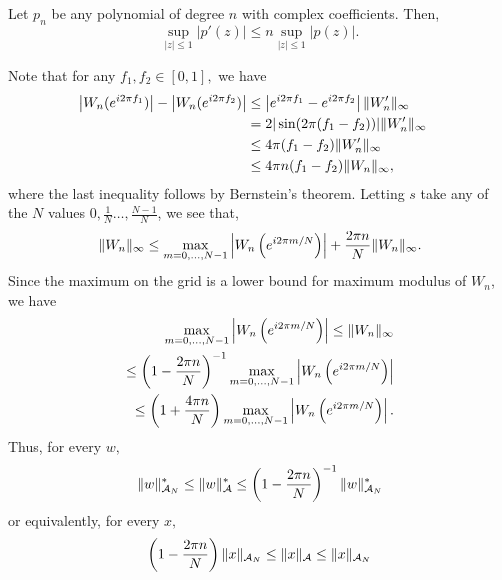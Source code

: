 \begin{theorem}
Let $p_n$ be any polynomial of degree $n$ with complex coefficients. Then,
\begin{equation*}
 \sup_{|z|\leq 1} |p'(z)|  \leq n  \sup_{|z|\leq 1} |p(z)|.
\end{equation*}
\end{theorem}
Note that for any $f_1, f_2 \in [0,1],$ we have
\begin{align*}
  \left|W_n(e^{i2\pi f_1})\right| - \left|W_n(e^{i2\pi f_2})\right|  &\leq   \left|e^{i2\pi f_1} - e^{i2\pi f_2}\right| \lVert W_n'\rVert_\infty&&\\
  &= 2|\sin(2\pi (f_1-f_2))| \lVert W_n'\rVert_\infty\\
  &\leq 4 \pi (f_1-f_2) \lVert W_n'\rVert_\infty\label{diff}\\
  & \leq 4 \pi n (f_1-f_2) \lVert W_n\rVert_\infty,
\end{align*}
where the last inequality follows by Bernstein's theorem.
Letting $s$ take any of the $N$ values $0,\tfrac{1}{N} \ldots, \tfrac{N-1}{N}$, we see that,
\begin{equation*}
\lVert W_n\rVert_\infty \leq \max_{m=0,\ldots,N-1}\left| W_n\left(e^{i 2 \pi m/N}\right) \right| + \frac{2\pi n}{N}\lVert W_n\rVert_\infty.
\end{equation*}
Since the maximum on the grid is a lower bound for maximum modulus of $W_n$, we have
\begin{align}
\max_{m=0,\ldots,N-1} \left| W_n\left(e^{i 2 \pi m/N}\right) \right| \leq \lVert W_n\rVert_\infty \\
\leq  \left(1-\frac{2\pi n}{N}\right)^{-1} \max_{m=0,\ldots,N-1} \left| W_n\left(e^{i 2 \pi m/N}\right) \right|\nonumber\\
 \leq  \left(1+\frac{4\pi n}{N}\right) \max_{m=0,\ldots,N-1} \left| W_n\left(e^{i 2 \pi m/N}\right) \right|.
\label{eq:grid-approx}
\end{align}
Thus, for every $w,$
\begin{equation}
\lVert w\rVert_{\mathcal{A}_N}^* \leq  \lVert w\rVert_{\mathcal{A}}^* \leq  \left(1-\frac{2\pi n}{N}\right)^{-1} \lVert w\rVert_{\mathcal{A}_N}^*
\end{equation}
or equivalently, for every $x,$
\begin{equation}
 \left(1-\frac{2\pi n}{N}\right) \lVert x\rVert_{\mathcal{A}_N} \leq  \lVert x\rVert_{\mathcal{A}} \leq \lVert x\rVert_{\mathcal{A}_N}
\end{equation}


